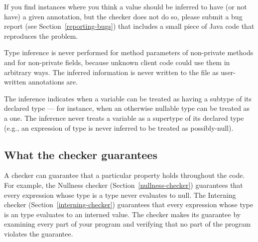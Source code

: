 If you find instances where you think a value should be inferred to have
(or not have) a
given annotation, but the checker does not do so, please submit a bug
report (see Section~\ref{reporting-bugs}) that includes a small piece of
Java code that reproduces the problem.

%
%



Type inference is never performed for method parameters of non-private
methods and for non-private fields, because unknown client code could use
them in arbitrary ways.  The inferred information is never written to the
 file as user-written annotations are.

The inference indicates when a variable can be treated as having a subtype
of its declared type --- for instance, when an otherwise nullable type can be
treated as a  one.  The inference never treats a variable as
a supertype of its declared type (e.g., an expression of 
type is never inferred to be treated as possibly-null).



\subsection{What the checker guarantees\label{checker-guarantees}}

A checker can guarantee that a particular property holds throughout the
code.  For example, the Nullness checker (Section~\ref{nullness-checker})
guarantees that every expression whose type is a  type never
evaluates to null.  The Interning checker (Section~\ref{interning-checker})
guarantees that every expression whose type is an  type
evaluates to an interned value.  The checker makes its guarantee by
examining every part of your program and verifying that no part of the
program violates the guarantee.


